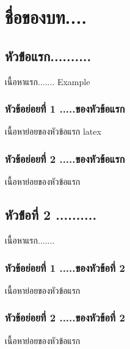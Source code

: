 \chapter{ชื่อของบท....}

\section{หัวข้่อแรก..........}
เนื้อหาแรก....... \Gls{Example}

\subsection{หัวข้อย่อยที่ 1 .....ของหัวข้อแรก}
เนื้อหาย่อยของหัวข้อแรก latex \textcite{haverbeke2018eloquent}

\subsection{หัวข้อย่อยที่ 2 .....ของหัวข้อแรก}
เนื้อหาย่อยของหัวข้อแรก


\section{หัวข้่อที่ 2 ..........}
เนื้อหาแรก.......

\subsection{หัวข้อย่อยที่ 1 .....ของหัวข้อที่ 2}
เนื้อหาย่อยของหัวข้อแรก

\subsection{หัวข้อย่อยที่ 2 .....ของหัวข้อที่ 2}
เนื้อหาย่อยของหัวข้อแรก